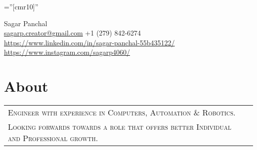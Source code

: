 \documentclass[a4paper,10pt]{article}
\begin{document}

\pagestyle{empty} %

\font\fb=''[cmr10]'' %

\par{\centering

		 \href{https://contacttheteam.github.io/LivingSpace/}{ \Uparrow }  {\Large Sagar Panchal\textsc{}}\\
		{\small \href{mailto:sagarp.creator@gmail.com}{sagarp.creator@gmail.com} 
		\textbullet \textsc{ +1 (279) 842-6274}
		}\\
		\small \href{https://www.linkedin.com/in/sagar-panchal-55b435122/}{https://www.linkedin.com/in/sagar-panchal-55b435122/}
		\textbullet \small \href{https://www.instagram.com/sagarp4060/}{https://www.instagram.com/sagarp4060/}
\par}


\section{About}
\begin{tabular}{ll}
\textsc{Engineer with experience in Computers,  Automation \& Robotics.}\\
\textsc{Looking forwards towards a role that offers better Individual and Professional growth.}\\
\end{tabular}
\end{document}
